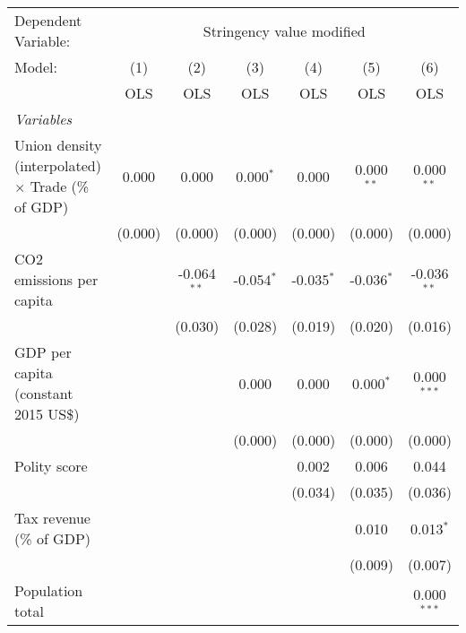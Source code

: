 
\begingroup
\centering
\begin{tabular}{lcccccc}
   \toprule
   Dependent Variable: & \multicolumn{6}{c}{Stringency value modified}\\
   Model:                                                    & (1)     & (2)           & (3)          & (4)          & (5)          & (6)\\  
                                                             &  OLS    & OLS           & OLS          & OLS          & OLS          & OLS\\  
   \midrule
   \emph{Variables}\\
   Union density (interpolated) $\times$ Trade (\% of GDP)   & 0.000   & 0.000         & 0.000$^{*}$  & 0.000        & 0.000$^{**}$ & 0.000$^{**}$\\   
                                                             & (0.000) & (0.000)       & (0.000)      & (0.000)      & (0.000)      & (0.000)\\   
   CO2 emissions per capita                                  &         & -0.064$^{**}$ & -0.054$^{*}$ & -0.035$^{*}$ & -0.036$^{*}$ & -0.036$^{**}$\\   
                                                             &         & (0.030)       & (0.028)      & (0.019)      & (0.020)      & (0.016)\\   
   GDP per capita (constant 2015 US\$)                       &         &               & 0.000        & 0.000        & 0.000$^{*}$  & 0.000$^{***}$\\   
                                                             &         &               & (0.000)      & (0.000)      & (0.000)      & (0.000)\\   
   Polity score                                              &         &               &              & 0.002        & 0.006        & 0.044\\   
                                                             &         &               &              & (0.034)      & (0.035)      & (0.036)\\   
   Tax revenue (\% of GDP)                                   &         &               &              &              & 0.010        & 0.013$^{*}$\\   
                                                             &         &               &              &              & (0.009)      & (0.007)\\   
   Population total                                          &         &               &              &              &              & 0.000$^{***}$\\   

\end{tabular}
